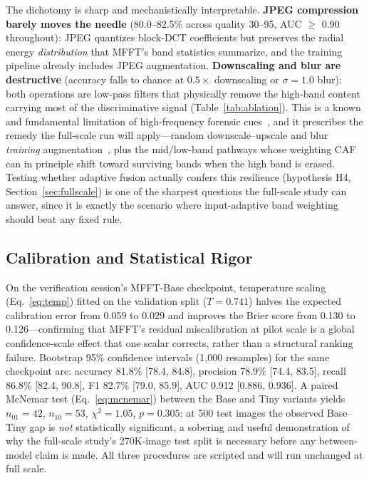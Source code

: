 \documentclass[journal]{IEEEtran}
\begin{document}
The dichotomy is sharp and mechanistically interpretable. \textbf{JPEG compression barely moves the needle} (80.0--82.5\% across quality 30--95, AUC $\ge$ 0.90 throughout): JPEG quantizes block-DCT coefficients but preserves the radial energy \emph{distribution} that MFFT's band statistics summarize, and the training pipeline already includes JPEG augmentation. \textbf{Downscaling and blur are destructive} (accuracy falls to chance at $0.5\times$ downscaling or $\sigma{=}1.0$ blur): both operations are low-pass filters that physically remove the high-band content carrying most of the discriminative signal (Table~\ref{tab:ablation}). This is a known and fundamental limitation of high-frequency forensic cues~\cite{wang2020,tan2024freqnet}, and it prescribes the remedy the full-scale run will apply---random downscale--upscale and blur \emph{training} augmentation~\cite{wang2020}, plus the mid/low-band pathways whose weighting CAF can in principle shift toward surviving bands when the high band is erased. Testing whether adaptive fusion actually confers this resilience (hypothesis H4, Section~\ref{sec:fullscale}) is one of the sharpest questions the full-scale study can answer, since it is exactly the scenario where input-adaptive band weighting should beat any fixed rule.

\subsection{Calibration and Statistical Rigor}
\label{sec:statprobes}
On the verification session's MFFT-Base checkpoint, temperature scaling (Eq.~\eqref{eq:temp}) fitted on the validation split ($T = 0.741$) halves the expected calibration error from 0.059 to 0.029 and improves the Brier score from 0.130 to 0.126---confirming that MFFT's residual miscalibration at pilot scale is a global confidence-scale effect that one scalar corrects, rather than a structural ranking failure. Bootstrap 95\% confidence intervals (1{,}000 resamples) for the same checkpoint are: accuracy 81.8\% [78.4, 84.8], precision 78.9\% [74.4, 83.5], recall 86.8\% [82.4, 90.8], F1 82.7\% [79.0, 85.9], AUC 0.912 [0.886, 0.936]. A paired McNemar test (Eq.~\eqref{eq:mcnemar}) between the Base and Tiny variants yields $n_{01}{=}42$, $n_{10}{=}53$, $\chi^2 = 1.05$, $p = 0.305$: at 500 test images the observed Base--Tiny gap is \emph{not} statistically significant, a sobering and useful demonstration of why the full-scale study's 270K-image test split is necessary before any between-model claim is made. All three procedures are scripted and will run unchanged at full scale.
\end{document}
